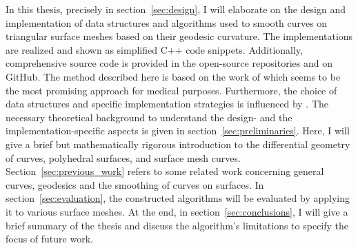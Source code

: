\documentclass{stdlocal}
\begin{document}
In this thesis, precisely in section~\ref{sec:design}, I will elaborate on the design and implementation of data structures and algorithms used to smooth curves on triangular surface meshes based on their geodesic curvature.
The implementations are realized and shown as simplified C++ code snippets.
Additionally, comprehensive source code is provided in the open-source repositories  and  on GitHub.
The method described here is based on the work of \textcite{lawonn2014} which seems to be the most promising approach for medical purposes.
Furthermore, the choice of data structures and specific implementation strategies is influenced by \textcite{mancinelli2022}.
The necessary theoretical background to understand the design- and the implementation-specific aspects is given in section~\ref{sec:preliminaries}.
Here, I will give a brief but mathematically rigorous introduction to the differential geometry of curves, polyhedral surfaces, and surface mesh curves.
Section~\ref{sec:previous_work} refers to some related work concerning general curves, geodesics and the smoothing of curves on surfaces.
In section~\ref{sec:evaluation}, the constructed algorithms will be evaluated by applying it to various surface meshes.
At the end, in section~\ref{sec:conclusions}, I will give a brief summary of the thesis and discuss the algorithm's limitations to specify the focus of future work.

\end{document}
